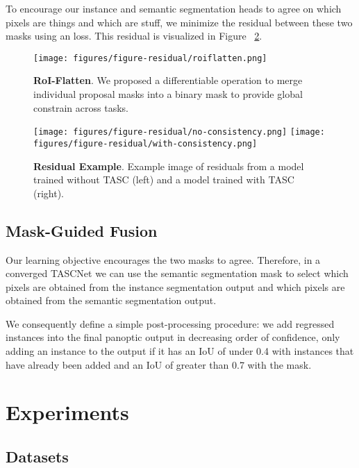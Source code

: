 \documentclass[10pt,twocolumn]{article}
\begin{document}
To encourage our instance and semantic segmentation heads to agree on which pixels are things and which are stuff, we minimize the residual between these two masks using an  loss. This residual is visualized in Figure ~\ref{fig:residual}.

\begin{figure}
    \centering
\texttt{[image: figures/figure-residual/roiflatten.png]} \hfill \\
    \vspace{4mm}
\caption{\textbf{RoI-Flatten}. We proposed a differentiable operation to merge individual proposal masks into a binary mask to provide global constrain across tasks.}
    \vspace*{1mm}
    \label{fig:roi}
\end{figure}
\begin{figure}
    \centering
    \texttt{[image: figures/figure-residual/no-consistency.png]}
    \texttt{[image: figures/figure-residual/with-consistency.png]}
    \caption{\textbf{Residual Example}. Example image of residuals from a model trained without TASC (left) and a model trained with TASC (right).}
    \label{fig:residual}
\end{figure}

\subsection{Mask-Guided Fusion}

Our learning objective encourages the two masks to agree. Therefore, in a converged TASCNet we can use the semantic segmentation mask to select which pixels are obtained from the instance segmentation output and which pixels are obtained from the semantic segmentation output. 

We consequently define a simple post-processing procedure: we add regressed instances into the final panoptic output in decreasing order of confidence, only adding an instance to the output if it has an IoU of under 0.4 with instances that have already been added and an IoU of greater than 0.7 with the mask. 
\section{Experiments}\label{sec:exp}
\subsection{Datasets}
\end{document}

